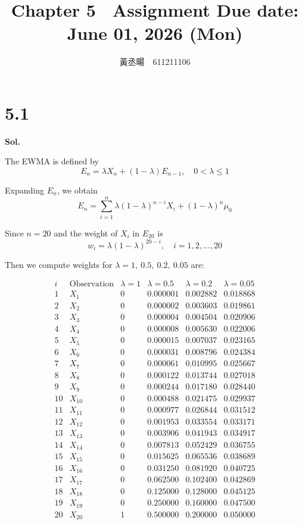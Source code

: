 \documentclass[a4paper, 12pt]{article}  %
\title{Chapter 5　Assignment \small{Due date: June 01, 2026 (Mon)}}
\author{黃丞暘　611211106}
\date{}
\begin{document}
\maketitle %

\section*{5.1}
\textbf{Sol.}

The EWMA is defined by
\[
E_n=\lambda X_n+(1-\lambda)E_{n-1},
\quad 0<\lambda\leq 1
\]

Expanding \(E_n\), we obtain
\[
E_n
=
\sum_{i=1}^{n}\lambda(1-\lambda)^{n-i}X_i
+
(1-\lambda)^n\mu_0
\]

Since \(n=20\) and the weight of \(X_i\) in \(E_{20}\) is
\[
w_i=\lambda(1-\lambda)^{20-i},
\quad i=1,2,\ldots,20
\]

Then we compute weights for \(\lambda=1,\ 0.5,\ 0.2,\ 0.05\) are:

\[
\begin{array}{c|c|c|c|c|c}
i & \text{Observation} & \lambda=1 & \lambda=0.5 & \lambda=0.2 & \lambda=0.05 \\ \hline
1  & X_1  & 0 & 0.000001 & 0.002882 & 0.018868\\
2  & X_2  & 0 & 0.000002 & 0.003603 & 0.019861\\
3  & X_3  & 0 & 0.000004 & 0.004504 & 0.020906\\
4  & X_4  & 0 & 0.000008 & 0.005630 & 0.022006\\
5  & X_5  & 0 & 0.000015 & 0.007037 & 0.023165\\
6  & X_6  & 0 & 0.000031 & 0.008796 & 0.024384\\
7  & X_7  & 0 & 0.000061 & 0.010995 & 0.025667\\
8  & X_8  & 0 & 0.000122 & 0.013744 & 0.027018\\
9  & X_9  & 0 & 0.000244 & 0.017180 & 0.028440\\
10 & X_{10} & 0 & 0.000488 & 0.021475 & 0.029937\\
11 & X_{11} & 0 & 0.000977 & 0.026844 & 0.031512\\
12 & X_{12} & 0 & 0.001953 & 0.033554 & 0.033171\\
13 & X_{13} & 0 & 0.003906 & 0.041943 & 0.034917\\
14 & X_{14} & 0 & 0.007813 & 0.052429 & 0.036755\\
15 & X_{15} & 0 & 0.015625 & 0.065536 & 0.038689\\
16 & X_{16} & 0 & 0.031250 & 0.081920 & 0.040725\\
17 & X_{17} & 0 & 0.062500 & 0.102400 & 0.042869\\
18 & X_{18} & 0 & 0.125000 & 0.128000 & 0.045125\\
19 & X_{19} & 0 & 0.250000 & 0.160000 & 0.047500\\
20 & X_{20} & 1 & 0.500000 & 0.200000 & 0.050000
\end{array}
\]
\end{document}
